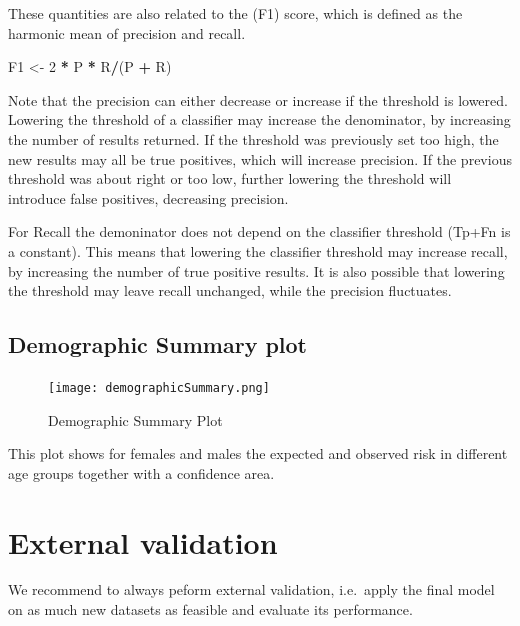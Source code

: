 \documentclass[]{article}
\newenvironment{Shaded}{\begin{snugshade}}{\end{snugshade}}
\newcommand{\DecValTok}[1]{\textcolor[rgb]{0.00,0.00,0.81}{#1}}
\newcommand{\StringTok}[1]{\textcolor[rgb]{0.31,0.60,0.02}{#1}}
\newcommand{\OperatorTok}[1]{\textcolor[rgb]{0.81,0.36,0.00}{\textbf{#1}}}
\newcommand{\NormalTok}[1]{#1}
\begin{document}
These quantities are also related to the (F1) score, which is defined as
the harmonic mean of precision and recall.

\begin{Shaded}
\begin{Highlighting}[]
\NormalTok{F1 <-}\StringTok{ }\DecValTok{2} \OperatorTok{*}\StringTok{ }\NormalTok{P }\OperatorTok{*}\StringTok{ }\NormalTok{R}\OperatorTok{/}\NormalTok{(P }\OperatorTok{+}\StringTok{ }\NormalTok{R)}
\end{Highlighting}
\end{Shaded}

Note that the precision can either decrease or increase if the threshold
is lowered. Lowering the threshold of a classifier may increase the
denominator, by increasing the number of results returned. If the
threshold was previously set too high, the new results may all be true
positives, which will increase precision. If the previous threshold was
about right or too low, further lowering the threshold will introduce
false positives, decreasing precision.

For Recall the demoninator does not depend on the classifier threshold
(Tp+Fn is a constant). This means that lowering the classifier threshold
may increase recall, by increasing the number of true positive results.
It is also possible that lowering the threshold may leave recall
unchanged, while the precision fluctuates.

\subsection{Demographic Summary plot}\label{demographic-summary-plot}

\begin{figure}
\centering
\texttt{[image: demographicSummary.png]}
\caption{Demographic Summary Plot}
\end{figure}

This plot shows for females and males the expected and observed risk in
different age groups together with a confidence area.

\newpage

\section{External validation}\label{external-validation}

We recommend to always peform external validation, i.e.~apply the final
model on as much new datasets as feasible and evaluate its performance.
\end{document}
